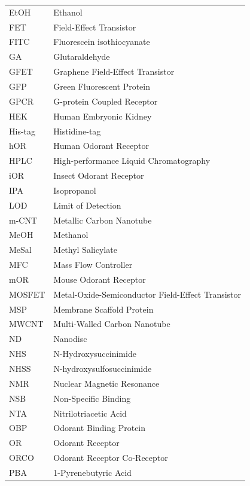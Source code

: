 \documentclass[
  a4paper,
]{scrbook}
\begin{document}
\newpage
\fancyhf{} %
\thispagestyle{fancy} %
\renewcommand{\headrulewidth}{0pt}
\fancyfoot[L]{\thepage} %
\begin{table}[H]
  \begin{tabular}{@{}p{} p{}@{}}  %
    EtOH  & Ethanol  \\[5pt]
    FET  & Field-Effect Transistor  \\[5pt]
    FITC  & Fluorescein isothiocyanate  \\[5pt]
    GA  & Glutaraldehyde  \\[5pt]
    GFET  & Graphene Field-Effect Transistor  \\[5pt]
    GFP  & Green Fluorescent Protein  \\[5pt]
    GPCR  & G-protein Coupled Receptor  \\[5pt]
    HEK  & Human Embryonic Kidney  \\[5pt]
    His-tag  & Histidine-tag  \\[5pt]
    hOR  & Human Odorant Receptor  \\[5pt]
    HPLC  & High-performance Liquid Chromatography   \\[5pt]
    iOR  & Insect Odorant Receptor  \\[5pt]
    IPA  & Isopropanol  \\[5pt]
    LOD  & Limit of Detection  \\[5pt]
    m-CNT  & Metallic Carbon Nanotube   \\[5pt]
    MeOH  & Methanol   \\[5pt]
    MeSal  & Methyl Salicylate   \\[5pt]
    MFC  & Mass Flow Controller   \\[5pt]
    mOR  & Mouse Odorant Receptor  \\[5pt]
    MOSFET  & Metal-Oxide-Semiconductor Field-Effect Transistor  \\[5pt]
    MSP  & Membrane Scaffold Protein  \\[5pt]
    MWCNT  & Multi-Walled Carbon Nanotube  \\[5pt]
    ND  & Nanodisc  \\[5pt]
    NHS  & N-Hydroxysuccinimide  \\[5pt]
    NHSS  & N-hydroxysulfosuccinimide   \\[5pt]
    NMR  & Nuclear Magnetic Resonance  \\[5pt]
    NSB  & Non-Specific Binding   \\[5pt]
    NTA  & Nitrilotriacetic Acid   \\[5pt]
    OBP  & Odorant Binding Protein  \\[5pt]
    OR  & Odorant Receptor  \\[5pt]
    ORCO  & Odorant Receptor Co-Receptor  \\[5pt]
    PBA  & 1-Pyrenebutyric Acid  \\[5pt]
  \end{tabular}
\end{table}
\end{document}
